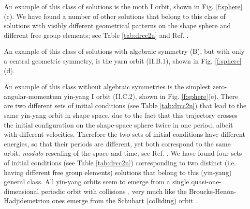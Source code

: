 \documentclass[twocolumn,showpacs,showkeys,preprintnumbers,amsmath,amssymb]{revtex4}
\begin{document}
 An example of this class of solutions is the 
moth I orbit, shown in Fig. \ref{f:sphere}(c). 
We have found a number of other solutions that 
belong to this class of solutions with visibly different geometrical patterns
on the shape sphere and different free group elements; see Table
\ref{tab:drcc2n} and Ref. \cite{Suvakov:2012b}.


 An example of this class of solutions with algebraic symmetry (B), 
but with only a central geometric symmetry, is the yarn orbit (II.B.1), shown in 
Fig. \ref{f:sphere}(d). 

 An example of this class without algebraic symmetries
is the simplest zero-angular-momentum yin-yang I orbit (II.C.2), 
shown in Fig. \ref{f:sphere}(e).  
There are two different sets of initial conditions (see Table
\ref{tab:drcc2n}) that lead 
to the same yin-yang orbit in shape space, due to the fact that this trajectory crosses 
the initial configuration on the shape-space sphere twice in one period, albeit with different 
velocities. 
Therefore the two sets of initial conditions have different energies, so that their periods 
are different, yet both correspond to the same orbit, {\it modulo} rescaling of the 
space and time, see Ref. \cite{Broucke1975b}. 
We have found four sets of initial conditions (see Table  \ref{tab:drcc2n}) 
corresponding to two distinct (i.e. having different free group elements) solutions
that belong to this (yin-yang) general class.
All yin-yang orbits seem to emerge from a single quasi-one-dimensional periodic 
orbit with collisions \cite{Suvakov:2012b},
very much like the Broucke-Henon-Hadjidemetriou ones emerge from the Schubart
(colliding) orbit \cite{Schubart1956}.
\end{document}
